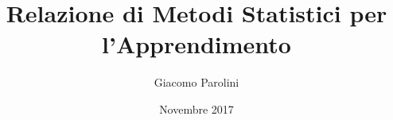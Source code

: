 \documentclass[12pt, letterpaper]{article}
\title{Relazione di Metodi Statistici per l'Apprendimento}
\author{Giacomo Parolini}
\date{Novembre 2017}
\begin{document}
\begin{titlepage}
\maketitle
\end{titlepage}

\tableofcontents
\pagebreak







\end{document}
